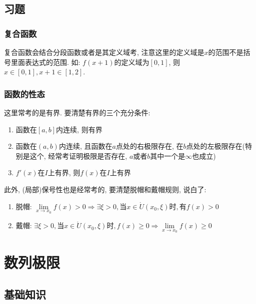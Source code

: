 \section{习题}
\subsection{复合函数}
复合函数会结合分段函数或者是其定义域考, 注意这里的定义域是$ x $的范围不是括号里面表达式的范围. 如: $ f(x+1) $的定义域为$ [0,1] $, 则$ x\in [0,1], x+1\in [1,2] $.
\subsection{函数的性态}
这里常考的是有界. 要清楚有界的三个充分条件:
\begin{enumerate}
\item 函数在$ [a,b] $内连续, 则有界
\item 函数在$ (a,b) $内连续, 且函数在$ a $点处的右极限存在, 在$ b $点处的左极限存在(特别是这个, 经常考证明极限是否存在, $ a $或者$ b $其中一个是$ \infty $也成立)
\item $ f'(x) $在$ I $上有界, 则$ f(x) $在$ I $上有界
\end{enumerate}\par
此外, (局部)保号性也是经常考的, 要清楚脱帽和戴帽规则, 说白了:
\begin{enumerate}
\item 脱帽: $ \lim\limits_{x \rightarrow x_{0}}f(x)>0\Rightarrow \exists \xi>0, \text{当}x\in \mathring{U}(x_{0}, \xi)\text{时}, \text{有}f(x)>0 $
\item 戴帽: $ \exists \xi>0, \text{当}x\in \mathring{U}(x_{0}, \xi)\text{时}, f(x)\ge 0\Rightarrow \lim\limits_{x \rightarrow x_{0}}f(x)\ge 0 $
\end{enumerate}
\chapter{数列极限}
\section{基础知识}
